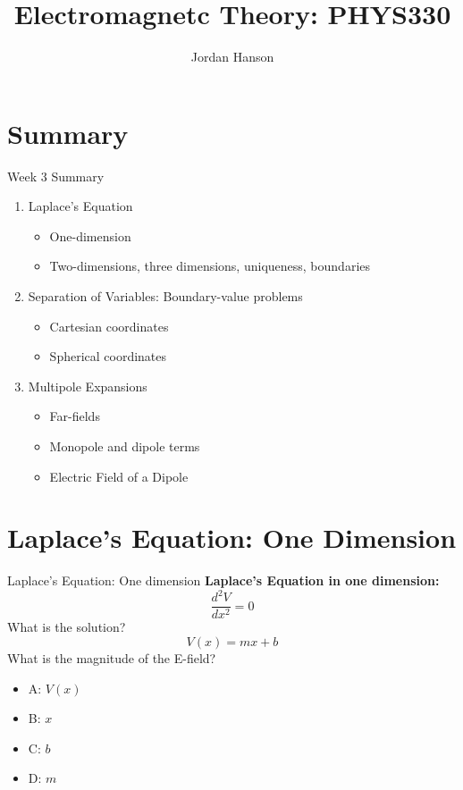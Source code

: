 \documentclass{beamer}
\title{Electromagnetc Theory: PHYS330}
\author{Jordan Hanson}
\institute{Whittier College Department of Physics and Astronomy}
\begin{document}
\maketitle

\section{Summary}

\begin{frame}{Week 3 Summary}
\begin{enumerate}
\item Laplace's Equation
\begin{itemize}
\item One-dimension
\item Two-dimensions, three dimensions, uniqueness, boundaries
\end{itemize}
\item Separation of Variables: Boundary-value problems
\begin{itemize}
\item Cartesian coordinates
\item Spherical coordinates
\end{itemize}
\item Multipole Expansions
\begin{itemize}
\item Far-fields
\item Monopole and dipole terms
\item Electric Field of a Dipole
\end{itemize}
\end{enumerate}
\end{frame}

\section{Laplace's Equation: One Dimension}

\begin{frame}{Laplace's Equation: One dimension}
\alert{\textbf{Laplace's Equation in one dimension:}}
\begin{equation}
\frac{d^2V}{dx^2} = 0
\end{equation}
What is the solution?
\begin{equation}
V(x) = mx + b
\end{equation}
What is the magnitude of the E-field?
\begin{itemize}
\item A: $V(x)$
\item B: $x$
\item C: $b$
\item D: $m$
\end{itemize}
\end{frame}
\end{document}
